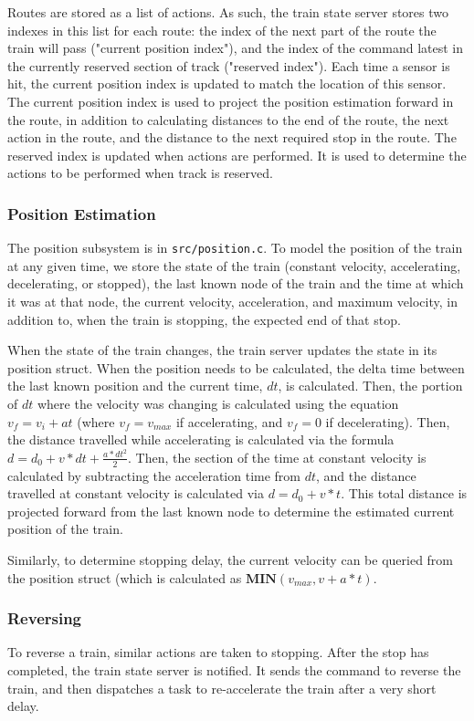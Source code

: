 \documentclass{article}
\begin{document}
Routes are stored as a list of actions.
As such, the train state server stores two indexes in this list for each route: the index of the next part of the route the train will pass ("current position index"), and the index of the command latest in the currently reserved section of track ("reserved index"). Each time a sensor is hit, the current position index is updated to match the location of this sensor.
The current position index is used to project the position estimation forward in the route, in addition to calculating distances to the end of the route, the next action in the route, and the distance to the next required stop in the route.
The reserved index is updated when actions are performed. It is used to determine the actions to be performed when track is reserved.

\subsubsection{Position Estimation}
The position subsystem is in \verb|src/position.c|.
To model the position of the train at any given time, we store the state of the train (constant velocity, accelerating, decelerating, or stopped), the last known node of the train and the time at which it was at that node, the current velocity, acceleration, and maximum velocity, in addition to, when the train is stopping, the expected end of that stop.

When the state of the train changes, the train server updates the state in its position struct.
When the position needs to be calculated, the delta time between the last known position and the current time, $dt$, is calculated.
Then, the portion of $dt$ where the velocity was changing is calculated using the equation $v_f = v_i + at$ (where $v_f = v_{max}$ if accelerating, and $v_f = 0$ if decelerating). 
Then, the distance travelled while accelerating is calculated via the formula $d = d_0 + v*dt + \frac{a *dt^2}{2}$. 
Then, the section of the time at constant velocity is calculated by subtracting the acceleration time from $dt$, and the distance travelled at constant velocity is calculated via $d = d_0 + v*t$. 
This total distance is projected forward from the last known node to determine the estimated current position of the train.

Similarly, to determine stopping delay, the current velocity can be queried from the position struct (which is calculated as $\textbf{MIN}(v_{max}, v + a*t)$.

\subsubsection{Reversing}
To reverse a train, similar actions are taken to stopping. After the stop has completed, the train state server is notified. It sends the command to reverse the train, and then dispatches a task to re-accelerate the train after a very short delay.
\end{document}
